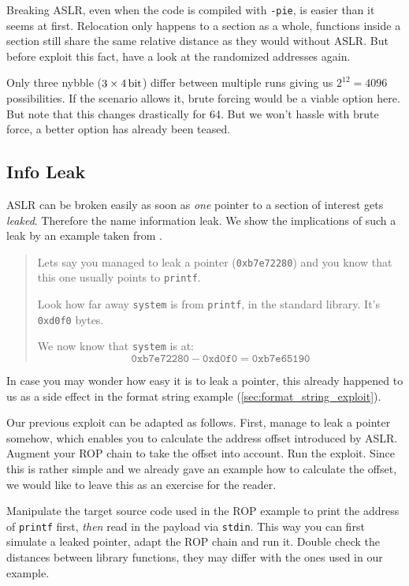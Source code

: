 \documentclass[article]{uibk}
\begin{document}
Breaking ASLR, even when the code is compiled with \texttt{-pie}, is easier
than it seems at first. Relocation only happens to a section as a whole,
functions inside a section still share the same relative distance as they would
without ASLR. But before exploit this fact, have a look at the randomized
addresses again.

Only three nybble ($3 \times \SI{4}{\bit}$) differ between multiple runs giving
us $2^{12} = 4096$ possibilities. If the scenario allows it, brute forcing
would be a viable option here. But note that this changes drastically for
\SI{64}{\bit}. But we won't hassle with brute force, a better option has
already been teased.

\subsection{Info Leak}
\label{sub:info_leak}

ASLR can be broken easily as soon as \emph{one} pointer to a section of
interest gets \emph{leaked}. Therefore the name information leak. We show the
implications of such a leak by an example taken from \cite{rpisec}.

\begin{quote}
    Lets say you managed to leak a pointer (\texttt{0xb7e72280}) and you know
    that this one usually points to \texttt{printf}.
    \medskip

    Look how far away \texttt{system} is from \texttt{printf}, in the standard
    library. It's \texttt{0xd0f0} bytes.
    \medskip

    We now know that \texttt{system} is at:
    \[ \mathtt{0xb7e72280} - \mathtt{0xd0f0} = \mathtt{0xb7e65190} \]
\end{quote}

In case you may wonder how easy it is to leak a pointer, this already happened
to us as a side effect in the format string example
(\cref{sec:format_string_exploit}).

Our previous exploit can be adapted as follows. First, manage to leak a pointer
somehow, which enables you to calculate the address offset introduced by ASLR.
Augment your ROP chain to take the offset into account. Run the exploit. Since
this is rather simple and we already gave an example how to calculate the
offset, we would like to leave this as an exercise for the reader.

Manipulate the target source code used in the ROP example to print the address
of \texttt{printf} first, \emph{then} read in the payload via \texttt{stdin}.
This way you can first simulate a leaked pointer, adapt the ROP chain and run
it. Double check the distances between library functions, they may differ with
the ones used in our example.
\end{document}
